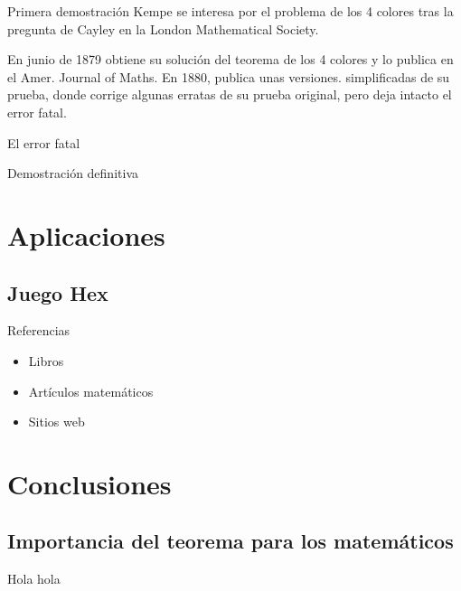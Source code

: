 \documentclass[spanish,utf8]{beamer}
\begin{document}
\begin{frame}{\insertsection}\transblindsvertical
\begin{block}{Primera demostración}
Kempe se interesa por el problema de los 4 colores tras la pregunta de Cayley en la London Mathematical Society.
\end{block}

\begin{block}{}
En junio de 1879 obtiene su solución del teorema de los 4 colores y lo publica en el Amer. Journal of Maths. En 1880, publica unas versiones. simplificadas de su prueba, donde corrige algunas erratas de su prueba original, pero deja intacto el error fatal.
\end{block}
    \end{frame}

\begin{frame}{\insertsection}\transblindsvertical
El error fatal
\end{frame}

\begin{frame}{\insertsection}\transblindsvertical
Demostración definitiva
\end{frame}

\section{Aplicaciones}

\subsection{Juego Hex}

\begin{frame}{\insertsection}\transblindsvertical

\end{frame}


\begin{frame}[allowframebreaks]{Referencias}\transblindsvertical
\begin{itemize}
	\item Libros
	\nocite{*}
	\printbibliography[heading=none,keyword=book]
	\item Artículos matemáticos
	\printbibliography[heading=none,keyword=paper]
	\item Sitios web
	\printbibliography[heading=none,keyword=online]
\end{itemize}
\end{frame}

\section{Conclusiones}
\subsection{Importancia del teorema para los matemáticos}

\begin{frame}
Hola hola
\end{frame}
\end{document}
